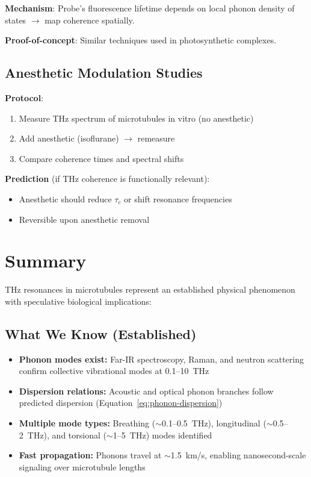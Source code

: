 \textbf{Mechanism}: Probe's fluorescence lifetime depends on local phonon density of states $\rightarrow$ map coherence spatially.

\textbf{Proof-of-concept}: Similar techniques used in photosynthetic
complexes.

\subsection{Anesthetic Modulation Studies}\label{anesthetic-modulation-studies}

\textbf{Protocol}:
\begin{enumerate}
\item Measure THz spectrum of microtubules in vitro (no anesthetic)
\item Add anesthetic (isoflurane) $\rightarrow$ remeasure
\item Compare coherence times and spectral shifts
\end{enumerate}

\textbf{Prediction} (if THz coherence is functionally relevant):
\begin{itemize}
\item Anesthetic should reduce $\tau_c$ or shift resonance frequencies
\item Reversible upon anesthetic removal
\end{itemize}




\section{Summary}
\label{sec:summary}

THz resonances in microtubules represent an established physical phenomenon with speculative biological implications:

\subsection{What We Know (Established)}

\begin{itemize}
\item \textbf{Phonon modes exist:} Far-IR spectroscopy, Raman, and neutron scattering confirm collective vibrational modes at 0.1--10~THz
\item \textbf{Dispersion relations:} Acoustic and optical phonon branches follow predicted dispersion (Equation~\ref{eq:phonon-dispersion})
\item \textbf{Multiple mode types:} Breathing ($\sim$0.1--0.5~THz), longitudinal ($\sim$0.5--2~THz), and torsional ($\sim$1--5~THz) modes identified
\item \textbf{Fast propagation:} Phonons travel at $\sim$1.5~km/s, enabling nanosecond-scale signaling over microtubule lengths
\end{itemize}

